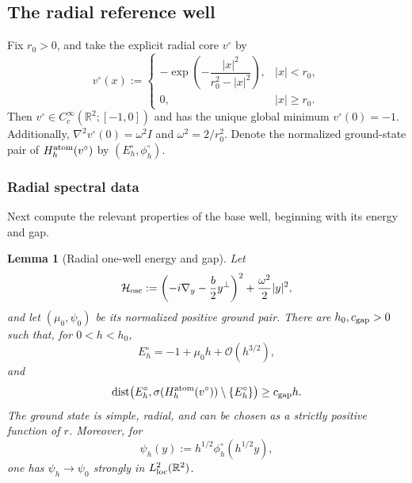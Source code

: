 \documentclass[11pt]{article}
\newtheorem{lemma}[theorem]{Lemma}
\newcommand{\R}{\mathbb R}
\newcommand{\cO}{\mathcal O}
\newcommand{\dist}{\operatorname{dist}}
\begin{document}
\subsection{The radial reference well}\label{sec:radial-one-well}
Fix $r_0>0$, and take the explicit radial core $v^\circ$ by
\begin{equation}\label{eq:explicit-core}
 v^\circ(x):=
 \begin{cases}
 -\exp\!\left(-\dfrac{|x|^2}{r_0^2-|x|^2}\right),&|x|<r_0,\\[1ex]
 0,&|x|\ge r_0.
 \end{cases}
\end{equation}
Then $v^\circ\in C_c^\infty(\R^2;[-1,0])$ and has the unique global minimum $v^\circ(0)=-1$. 
Additionally,
 $\nabla^2v^\circ(0)=\omega^2 I$ and $\omega^2=2/r_0^2$.
Denote the normalized ground-state pair of $H_h^{\rm atom}(v^\circ)$ by $(E_h^\circ,\phi_h^\circ)$.

\subsubsection{Radial spectral data}
Next compute the relevant properties of the base well, beginning with its energy and gap.
\begin{lemma}[Radial one-well energy and gap]\label{lem:radial-spectral}
Let
\begin{equation}\label{eq:oscillator-operator}
 \mathcal H_{\rm osc}
 :=\left(-i\nabla_y-\frac b2y^\perp\right)^2
 +\frac{\omega^2}{2}|y|^2,
\end{equation}
and let $(\mu_0,\psi_0)$ be its normalized positive ground pair.  There are
$h_0,c_{\rm gap}>0$ such that, for $0<h<h_0$,
\begin{equation}\label{eq:base-energy}
 E_h^\circ=-1+\mu_0h+\cO(h^{3/2}),
\end{equation}
and
\begin{equation}\label{eq:base-gap}
 \dist\!\left(E_h^\circ,\sigma(H_h^{\rm atom}(v^\circ))\setminus\{E_h^\circ\}\right)
 \ge c_{\rm gap}h.
\end{equation}
The ground state is simple, radial, and can be chosen as a strictly positive
function of $r$. Moreover, for
\begin{equation}\label{eq:rescaled-radial-ground-state}
 \psi_h(y):=h^{1/2}\phi_h^\circ(h^{1/2}y),
\end{equation}
one has $\psi_h\to\psi_0$ strongly in $L^2_{\rm loc}(\R^2)$. \end{lemma}
\end{document}
